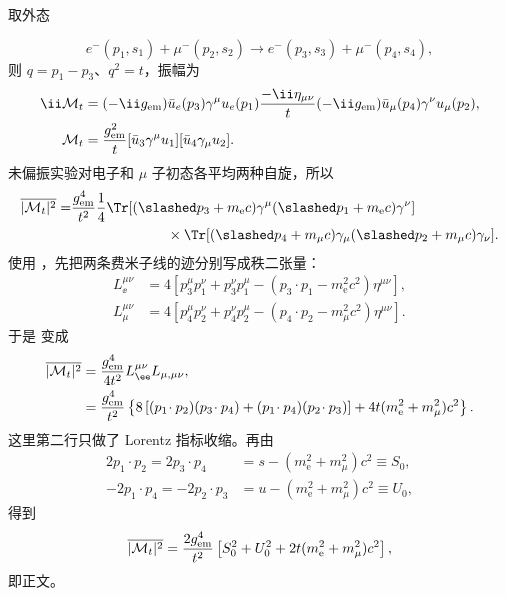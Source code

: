 \begin{derivation}
取外态

\begin{equation*}
 e^-(p_1,s_1)+\mu^-(p_2,s_2)
 \to e^-(p_3,s_3)+\mu^-(p_4,s_4),
\end{equation*}
则 $q=p_1-p_3$、$q^2=t$，振幅为
\begin{align*}
 \ii\mathcal M_t
 &=(-\ii g_{\rm em})\bar u_e(p_3)\gamma^\mu u_e(p_1)
 \frac{-\ii\eta_{\mu\nu}}{t}
 (-\ii g_{\rm em})\bar u_\mu(p_4)\gamma^\nu u_\mu(p_2),\\
 \mathcal M_t
 &=\frac{g_{\rm em}^2}{t}
 [\bar u_3\gamma^\mu u_1]
 [\bar u_4\gamma_\mu u_2].
 \end{align*}
未偏振实验对电子和 $\mu$ 子初态各平均两种自旋，所以
\begin{align*}
 \overline{|\mathcal M_t|^2}
 =&\frac{g_{\rm em}^4}{t^2}\frac14
 \Tr[(\slashed p_3+m_{\mathrm e} c)\gamma^\mu(\slashed p_1+m_{\mathrm e} c)\gamma^\nu]\nonumber\\
 &\hspace{2.4cm}\times
 \Tr[(\slashed p_4+m_\mu c)\gamma_\mu(\slashed p_2+m_\mu c)\gamma_\nu].
 \end{align*}
使用 ，先把两条费米子线的迹分别写成秩二张量：
\begin{align*}
 L_\ee^{\mu\nu}
 &=4\left[
 p_3^\mu p_1^\nu+p_3^\nu p_1^\mu
 -(p_3\!\cdot p_1-m_{\mathrm e}^2c^2)\eta^{\mu\nu}
 \right],\\
 L_\mu^{\mu\nu}
 &=4\left[
 p_4^\mu p_2^\nu+p_4^\nu p_2^\mu
 -(p_4\!\cdot p_2-m_\mu^2c^2)\eta^{\mu\nu}
 \right].
 \end{align*}
于是  变成
\begin{align*}
 \overline{|\mathcal M_t|^2}
 &=\frac{g_{\rm em}^4}{4t^2}L_\ee^{\mu\nu}L_{\mu,\mu\nu},\\
 &=\frac{g_{\rm em}^4}{t^2}\left\{
 8\left[(p_1\!\cdot p_2)(p_3\!\cdot p_4)
 +(p_1\!\cdot p_4)(p_2\!\cdot p_3)\right]
 +4t(m_{\mathrm e}^2+m_\mu^2)c^2
 \right\}.
 \end{align*}
这里第二行只做了 Lorentz 指标收缩。再由
\begin{align*}
 2p_1\!\cdot p_2=2p_3\!\cdot p_4
 &=s-(m_{\mathrm e}^2+m_\mu^2)c^2\equiv S_0,\\
 -2p_1\!\cdot p_4=-2p_2\!\cdot p_3
 &=u-(m_{\mathrm e}^2+m_\mu^2)c^2\equiv U_0,
\end{align*}
得到
\begin{align*}
 \overline{|\mathcal M_t|^2}
 =\frac{2g_{\rm em}^4}{t^2}
 \left[
 S_0^2+U_0^2+2t(m_{\mathrm e}^2+m_\mu^2)c^2
 \right],
\end{align*}
即正文。


\end{derivation}

